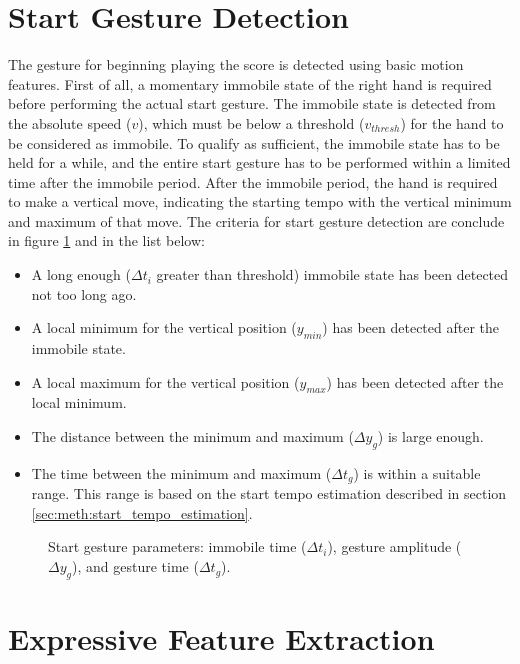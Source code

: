 \section{Start Gesture Detection}

The gesture for beginning playing the score
is detected using basic motion features.
First of all,
a momentary immobile state of the right hand is required
before performing the actual start gesture.
The immobile state is detected from the absolute speed ($v$),
which must be below a threshold ($v_{thresh}$)
for the hand to be considered as immobile.
To qualify as sufficient,
the immobile state has to be held for a while,
and the entire start gesture has to be performed
within a limited time after the immobile period.
After the immobile period,
the hand is required to make a vertical move,
indicating the starting tempo with the 
vertical minimum and maximum of that move.
The criteria for start gesture detection
are conclude in figure \ref{fig:start_gesture}
and in the list below:
\begin{itemize}
\item A long enough ($\Delta t_i$ greater than threshold)
immobile state has been detected not too long ago.
\item A local minimum for the vertical position ($y_{min}$) has been detected after the immobile state.
\item A local maximum for the vertical position ($y_{max}$) has been detected after the local minimum.
\item The distance between the minimum and maximum ($\Delta y_g$) is large enough.
\item The time between the minimum and maximum ($\Delta t_g$)
is within a suitable range.
This range is based on the start tempo estimation described in section
\ref{sec:meth:start_tempo_estimation}.
\end{itemize}

\begin{figure}
\begin{center}

\caption{
Start gesture parameters:
immobile time ($\Delta t_i$),
gesture amplitude ($\Delta y_g$), and
gesture time ($\Delta t_g$).
}
\label{fig:start_gesture}
\end{center}
\end{figure}

\section{Expressive Feature Extraction}

